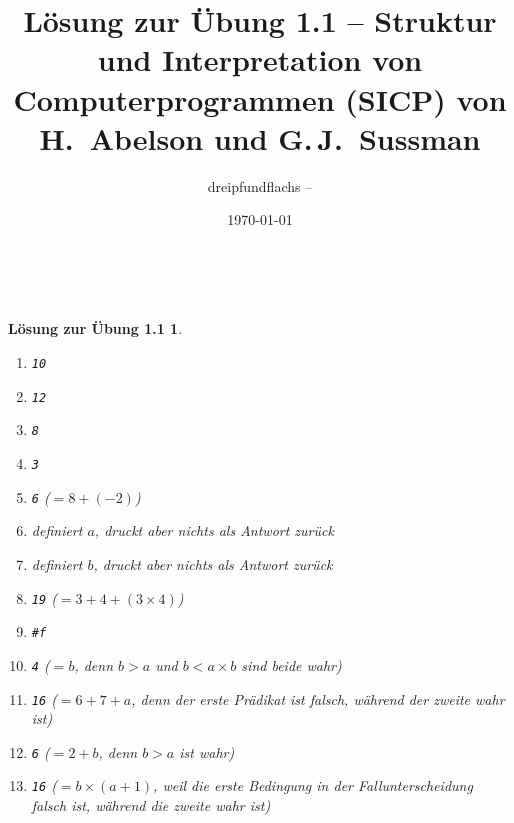 \documentclass[a4paper,11pt,reqno]{amsart}
\theoremstyle{uremark}
\newtheorem*{loes}{L\"osung zur \"Ubung 1.1}
\begin{document}
\title[]{L\"osung zur \"Ubung 1.1 -- Struktur und Interpretation von
Computerprogrammen (SICP) von H.~Abelson und G.\,J.~Sussman}
\author{dreipfundflachs --
\href{https://github.com/dreipfundflachs}{}}
\date{\today}
\maketitle
\

\begin{loes}\ 
\begin{enumerate}[label=\small$\bullet$]
    \item \texttt{10}
    \item \texttt{12}
    \item \texttt{8}
    \item \texttt{3}
    \item \texttt{6} ($ = 8  + (-2)$)
    \item definiert $ a $, druckt aber nichts als Antwort zur\"uck
    \item definiert $ b $, druckt aber nichts als Antwort zur\"uck
    \item \texttt{19} ($ = 3 + 4 + (3 \times 4) $) 
    \item \texttt{\#f}
    \item \texttt{4} ($ = b $, denn $ b > a $ und $ b < a \times b $ sind beide
            wahr)
    \item \texttt{16} ($ = 6 + 7 + a $, denn der erste Pr\"adikat ist
        falsch, w\"ahrend der zweite wahr ist)
    \item \texttt{6} ($ = 2 + b $, denn $ b > a $ ist wahr)
    \item \texttt{16} ($ = b \times (a + 1) $, weil die erste Bedingung in der
        Fallunterscheidung \ttt{cond} falsch ist, w\"ahrend die zweite wahr ist)
\end{enumerate}
\end{loes}
\end{document}
